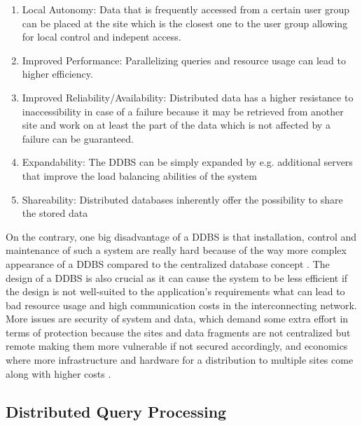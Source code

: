 \begin{enumerate}
    \item Local Autonomy: Data that is frequently accessed from a certain user group can be placed at the site which is the closest one to the user group
            allowing for local control and indepent access.
    \item Improved Performance: Parallelizing queries and resource usage can lead to higher efficiency.
    \item Improved Reliability/Availability: Distributed data has a higher resistance to inaccessibility in case of a failure because it may be retrieved 
            from another site and work on at least the part of the data which is not affected by a failure can be guaranteed. 
    \item Expandability: The DDBS can be simply expanded by e.g. additional servers that improve the load balancing abilities of the system
    \item Shareability: Distributed databases inherently offer the possibility to share the stored data
\end{enumerate}

On the contrary, one big disadvantage of a DDBS is that installation, control and maintenance of such a system are really hard because of the way
more complex appearance of a DDBS compared to the centralized database concept \citep{Jadhav2017}. The design of a DDBS is also crucial as it can cause 
the system to be less efficient if the design is not well-suited to the application's requirements what can lead to bad resource usage and high
communication costs in the interconnecting network. More issues are security of system and data, which demand some extra effort in terms of protection
because the sites and data fragments are not centralized but remote making them more vulnerable if not secured accordingly, and economics where more
infrastructure and hardware for a distribution to multiple sites come along with higher costs \cite{Kumar2013}.


\subsection{Distributed Query Processing}
\label{sec:theo_dqp}

